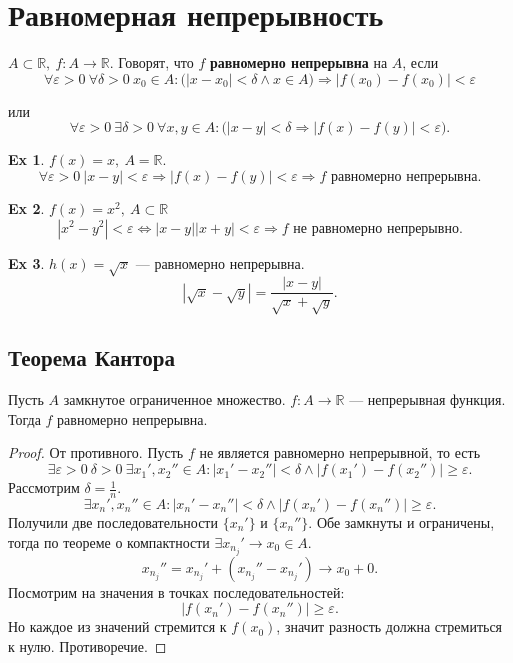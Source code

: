 \documentclass[11pt]{book}
\newcommand{\R}{\mathbb{R}}
\renewcommand{\ge}{\geqslant}
\theoremstyle{definition}
\theoremstyle{plain}
\theoremstyle{plain}
\theoremstyle{definition}
\newtheorem*{ex}{Ex}
\theoremstyle{remark}
\begin{document}
\section{Равномерная непрерывность}
\begin{defn}
    $ A \subset \R, ~ f: A \to  \R$.
    Говорят, что $ f$  {\bf равномерно непрерывна} на $ A$, если
    $$ \forall  \varepsilon >0 ~ \forall  \delta>0 ~ x_0 \in A : \bigl(|x-x_0|< \delta \wedge x \in A\bigr) \Longrightarrow |f(x_0) -f(x_0)| < \varepsilon $$

    или \[
	\forall \varepsilon >0 ~ \exists \delta  >0 ~ \forall x, y \in A: \bigl( |x-y|< \delta \Longrightarrow |f(x) -f(y)|< \varepsilon \bigr)
    .\]
\end{defn}
\begin{ex}
    $ f(x) = x, ~ A = \R$.
    \[
	\forall  \varepsilon >0 ~ |x -y| < \varepsilon  \Longrightarrow  |f(x)-f(y)| < \varepsilon  \Longrightarrow f \text{ равномерно непрерывна}
    .\]
\end{ex}
\begin{ex}
    $ f(x) = x^2, ~ A \subset \R$
    \[
	|x^2 - y^2| < \varepsilon  \Longleftrightarrow  |x-y||x+y| < \varepsilon \Longrightarrow f \text{ не равномерно непрерывно}
    .\]
\end{ex}
\begin{ex}
    $ h(x) = \sqrt {x}$ --- равномерно   непрерывна.
    \[
	\left| \sqrt{x} - \sqrt{y} \right| = \frac{|x-y|}{\sqrt{x} + \sqrt{y}}
    .\]
\end{ex}
\subsection{Теорема Кантора}
\begin{thm}[Кантор]\label{th_kantor}
    Пусть $ A$ замкнутое ограниченное множество.  $ f: A \to  \R$ --- непрерывная функция. Тогда $ f$ равномерно непрерывна.
\end{thm}
\begin{proof}
    От противного. Пусть $ f$ не является равномерно непрерывной, то есть \[
	\exists \varepsilon >0 ~ \delta >0 ~ \exists x_1', x_2'' \in A: |x_1'-x_2''| < \delta \wedge |f(x_1')-f(x_2'')| \ge \varepsilon
    .\]
    Рассмотрим $ \delta = \frac{1}{n}$.
    \[
	\exists x_{n}', x_{n}'' \in A: |x_{n}' - x_{n}''|<\delta  \wedge |f(x_{n}')-f(x_{n}'')| \ge \varepsilon
    .\]
    Получили две последовательности $ \{x_{n}'\}$ и $ \{x_{n}''\}$.
    Обе замкнуты и ограничены, тогда по теореме о компактности $ \exists x_{n_j}' \to  x_0 \in A$.
    \[
	x_{n_j}'' = x_{n_j}' + (x_{n_j}'' - x_{n_j}') \to  x_0 + 0
    .\]
    Посмотрим на значения в точках последовательностей:
    \[
	|f(x_{n}') - f(x_{n}'')| \ge \varepsilon
    .\]
    Но каждое  из значений стремится к  $ f(x_0)$, значит разность должна стремиться к нулю. Противоречие.
\end{proof}
\end{document}
